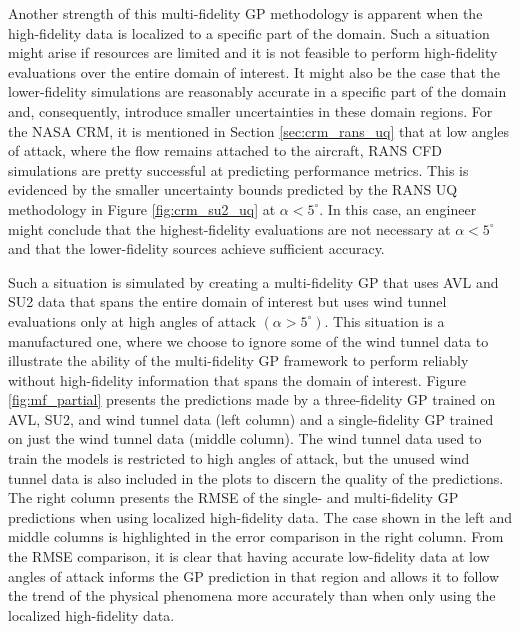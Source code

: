 Another strength of this multi-fidelity GP methodology is apparent when the high-fidelity data is localized to a specific part of the domain.
Such a situation might arise if resources are limited and it is not feasible to perform high-fidelity evaluations over the entire domain of interest.
It might also be the case that the lower-fidelity simulations are reasonably accurate in a specific part of the domain and, consequently, introduce smaller uncertainties in these domain regions.
For the NASA CRM, it is mentioned in Section \ref{sec:crm_rans_uq} that at low angles of attack, where the flow remains attached to the aircraft, RANS CFD simulations are pretty successful at predicting performance metrics.
This is evidenced by the smaller uncertainty bounds predicted by the RANS UQ methodology in Figure \ref{fig:crm_su2_uq} at $\alpha < 5^\circ$.
In this case, an engineer might conclude that the highest-fidelity evaluations are not necessary at $\alpha < 5^\circ$ and that the lower-fidelity sources achieve sufficient accuracy.

Such a situation is simulated by creating a multi-fidelity GP that uses AVL and SU2 data that spans the entire domain of interest but uses wind tunnel evaluations only at high angles of attack $(\alpha > 5^\circ)$.
This situation is a manufactured one, where we choose to ignore some of the wind tunnel data to illustrate the ability of the multi-fidelity GP framework to perform reliably without high-fidelity information that spans the domain of interest.
Figure \ref{fig:mf_partial} presents the predictions made by a three-fidelity GP trained on AVL, SU2, and wind tunnel data (left column) and a single-fidelity GP trained on just the wind tunnel data (middle column).
The wind tunnel data used to train the models is restricted to high angles of attack, but the unused wind tunnel data is also included in the plots to discern the quality of the predictions.
The right column presents the RMSE of the single- and multi-fidelity GP predictions when using localized high-fidelity data.
The case shown in the left and middle columns is highlighted in the error comparison in the right column.
From the RMSE comparison, it is clear that having accurate low-fidelity data at low angles of attack informs the GP prediction in that region and allows it to follow the trend of the physical phenomena more accurately than when only using the localized high-fidelity data.

